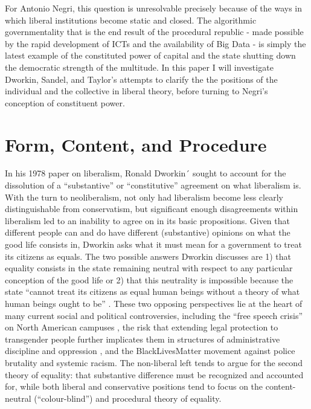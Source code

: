 \documentclass[12pt,oneside]{memoir}
\begin{document}
For Antonio Negri, this question is unresolvable precisely because of the ways in which liberal institutions become static and closed. The algorithmic governmentality that is the end result of the procedural republic - made possible by the rapid development of ICTs and the availability of Big Data - is simply the latest example of the constituted power of capital and the state shutting down the democratic strength of the multitude. In this paper I will investigate Dworkin, Sandel, and Taylor's attempts to clarify the the positions of the individual and the collective in liberal theory, before turning to Negri's conception of constituent power.

	

\section*{Form, Content, and Procedure}


In his 1978 paper on liberalism, Ronald Dworkin´ sought to account for the dissolution of a ``substantive'' or ``constitutive'' agreement on what liberalism is. With the turn to neoliberalism, not only had liberalism become less clearly distinguishable from conservatism, but significant enough disagreements within liberalism led to an inability to agree on in its basic propositions. Given that different people can and do have different (substantive) opinions on what the good life consists in, Dworkin asks what it must mean for a government to treat its citizens as equals. The two possible answers Dworkin discusses are 1) that equality consists in the state remaining neutral with respect to any particular conception of the good life or 2) that this neutrality is impossible because the state ``cannot treat its citizens as equal human beings without a theory of what human beings ought to be'' \citep[127]{Dworkin1978}. These two opposing perspectives lie at the heart of many current social and political controversies, including the ``free speech crisis'' on North American campuses \citep{mackinnon-2018}, the risk that extending legal protection to transgender people further implicates them in structures of administrative discipline and oppression \citep{Spade2015}, and the BlackLivesMatter movement against police brutality and systemic racism. The non-liberal left tends to argue for the second theory of equality: that substantive difference must be recognized and accounted for, while both liberal and conservative positions tend to focus on the content-neutral (``colour-blind'') and procedural theory of equality.
	
\end{document}
